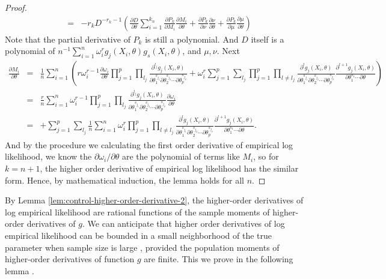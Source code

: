 \begin{proof}
\begin{eqnarray*}
&= &-r_{k}D^{-r_{k}-1}\left(\frac{\partial D}{\partial\theta}\sum_{i=1}^{k_{n}}\frac{\partial P_{k}}{\partial M_{i}}\frac{\partial M_{i}}{\partial\theta}+\frac{\partial P_{k}}{\partial\nu}\frac{\partial\nu}{\partial\theta}+\frac{\partial P_{k}}{\partial\mu}\frac{\partial\mu}{\partial\theta}\right)
\end{eqnarray*}
Note that the partial derivative of $P_{k}$ is still a polynomial.
And $D$ itself is a polynomial of $n^{-1}\sum_{i=1}^{n}\omega_{i}^{r}g_{j}\left(X_{i},\theta\right)g_{s}\left(X_{i},\theta\right)$,
and $\mu,\nu$. Next 
\begin{eqnarray*}
\frac{\partial M_{i}}{\partial\theta} & = & \frac{1}{n}\sum_{i=1}^{n}\left(r\omega_{i}^{r-1}\frac{\partial\omega_{i}}{\partial\theta}\prod_{j=1}^{p}\prod_{l_{j}}\frac{\partial^{l_{j}}g_{j}\left(X_{i},\theta\right)}{\partial\theta_{1}^{s_{j_{1}}}\partial\theta_{2}^{s_{j_{2}}}\cdots\partial\theta_{p}^{s_{j_{p}}}}+\omega_{i}^{r}\sum_{j=1}^{p}\sum_{l_{j}}\prod_{j=1}^{p}\prod_{l\neq l_{j}}\frac{\partial^{l}g_{j}\left(X_{i},\theta\right)}{\partial\theta_{1}^{s_{j_{1}}}\partial\theta_{2}^{s_{j_{2}}}\cdots\partial\theta_{p}^{s_{j_{p}}}}\frac{\partial^{l+1}g_{j}\left(X_{i},\theta\right)}{\partial\theta_{1}^{s_{1}}\cdots\partial\theta}\right)\\
 & = & \frac{r}{n}\sum_{i=1}^{n}\omega_{i}^{r-1}\prod_{j=1}^{p}\prod_{l_{j}}\frac{\partial^{l_{j}}g_{j}\left(X_{i},\theta\right)}{\partial\theta_{1}^{s_{j_{1}}}\partial\theta_{2}^{s_{j_{2}}}\cdots\partial\theta_{p}^{s_{j_{p}}}}\frac{\partial\omega_{i}}{\partial\theta} \\
 &=& +\sum_{j=1}^{p}\sum_{l_{j}}\frac{1}{n}\sum_{i=1}^{n}\omega_{i}^{r}\prod_{j=1}^{p}\prod_{l\neq l_{j}}\frac{\partial^{l}g_{j}\left(X_{i},\theta\right)}{\partial\theta_{1}^{s_{j_{1}}}\partial\theta_{2}^{s_{j_{2}}}\cdots\partial\theta_{p}^{s_{j_{p}}}}\frac{\partial^{l+1}g_{j}\left(X_{i},\theta\right)}{\partial\theta_{1}^{s_{1}}\cdots\partial\theta}.
\end{eqnarray*}
And by the procedure we calculating the first order derivative of
empirical log likelihood, we know the $\partial\omega_{i}/\partial\theta$
are the polynomial of terms like $M_{i}$, so for $k=n+1$, the higher
order derivative of empirical log likelihood has the similar form.
Hence, by mathematical induction, the lemma holds for all $n$. 
\end{proof}
By Lemma \ref{lem:control-higher-order-derivative-2}, the higher-order derivatives of log empirical likelihood are rational functions of the sample moments of higher-order derivatives of  $g$. We can anticipate
that higher order derivatives of log empirical likelihood can be bounded
in a small neighborhood of the true parameter when sample size is
large , provided the population moments of higher-order derivatives of function $g$ are finite. This we prove in the following lemma .


